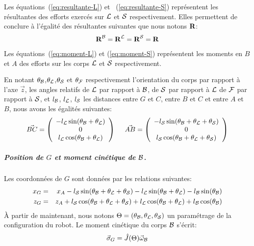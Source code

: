 Les équations (\ref{eq:resultante-L}) et  (\ref{eq:resultante-S})
représentent les résultantes des efforts exercés sur ${\cal L}$ et
${\cal S}$ respectivement. Elles permettent de conclure à l'égalité
des résultantes suivantes que nous notons $\textbf{R}$:
$$
\textbf{R}^{\cal B} = \textbf{R}^{\cal L} = \textbf{R}^{\cal S} = \textbf{R}
$$
Les équations (\ref{eq:moment-L}) et
(\ref{eq:moment-S}) représentent les moments en $B$ et $A$ des efforts
sur les corps ${\cal L}$ et ${\cal S}$ respectivement.

En notant $\theta_{\cal B}$,$\theta_{\cal L}$,$\theta_{\cal S}$ et
$\theta_{\cal F}$ respectivement l'orientation du corps par rapport à
l'axe $\vec{z}$, les angles relatifs de ${\cal L}$ par rapport à
${\cal B}$, de ${\cal S}$ par rapport à ${\cal L}$ de ${\cal F}$ par
rapport à ${\cal S}$, et $l_{\cal B}$, $l_{\cal L}$, $l_{\cal S}$ les
distances entre $G$ et $C$, entre $B$ et $C$ et entre $A$ et $B$, nous
avons les égalités suivantes:
$$
\vec{BC} =
\left(\begin{array}{c}
-l_{\cal L} \sin(\theta_{\cal B}+\theta_{\cal L}) \\
0\\
l_{\cal L} \cos(\theta_{\cal B}+\theta_{\cal L})
\end{array}\right)
\ \ \ \
\vec{AB} =
\left(\begin{array}{c}
-l_{\cal S} \sin(\theta_{\cal B}+\theta_{\cal L}+\theta_{\cal S}) \\
0\\
l_{\cal S} \cos(\theta_{\cal B}+\theta_{\cal L}+\theta_{\cal S})
\end{array}\right)
$$
\subparagraph{Position de $G$ et moment cinétique de ${\cal B}$.}
Les coordonnées de $G$ sont données par les relations suivantes:
\begin{eqnarray}
  \label{eq:xG}
  x_G &=& x_A -l_{\cal S} \sin(\theta_{\cal B}+\theta_{\cal
    L}+\theta_{\cal S}) -l_{\cal L} \sin(\theta_{\cal B}+\theta_{\cal
    L}) -l_{\cal B} \sin(\theta_{\cal B}) \\
  \label{eq:zG}
  z_G &=& z_A + l_{\cal S} \cos(\theta_{\cal B}+\theta_{\cal
    L}+\theta_{\cal S}) + l_{\cal L} \cos(\theta_{\cal B}+\theta_{\cal
    L}) + l_{\cal B} \cos(\theta_{\cal B})
\end{eqnarray}
À partir de maintenant, nous notons $\Theta = (\theta_{\cal B},
\theta_{\cal L}, \theta_{\cal S})$ un paramétrage de la configuration
du robot. Le moment cinétique du corps ${\cal B}$ s'écrit:
\begin{equation}\label{eq:sigma-G}
\vec{\sigma}_G = \hat{J}(\Theta) \vec{\omega}_{\cal B}
\end{equation}
